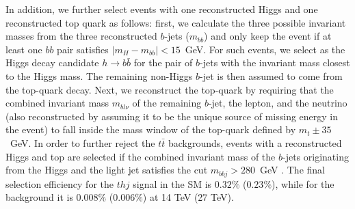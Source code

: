 \documentclass[11pt,a4paper]{article}
\begin{document}
\noindent In addition, we further select events with one reconstructed Higgs and one reconstructed top quark as follows: first, we calculate the three possible invariant masses from the three reconstructed $b$-jets ($m_{bb}$) and only keep the event if at least one $bb$ pair satisfies $|m_H-m_{bb}|<15$~GeV. For such events, we select as the Higgs decay candidate $h\to b\bar b$ for the pair of $b$-jets with the invariant mass closest to the Higgs mass. The remaining non-Higgs $b$-jet is then assumed to come from the top-quark decay. Next, we reconstruct the top-quark by requiring that the combined invariant mass $m_{bl\nu}$ of the remaining $b$-jet, the lepton, and the neutrino (also reconstructed by assuming it to be the unique source of missing energy in the event) to fall inside the mass window of the top-quark defined by $m_t\pm 35$~GeV. In order to further reject the $t
\bar t$ backgrounds, events with a reconstructed Higgs and top are selected if the combined invariant mass of the $b$-jets originating from the Higgs and the light jet satisfies the cut $m_{bbj}>280$~GeV \cite{Farina:2012xp}. The final selection efficiency for the $thj$ signal in the SM is $0.32\%$ ($0.23\%$), while for the background it is $0.008\%$ ($0.006\%$) at 14 TeV (27 TeV).\\ 
\end{document}

